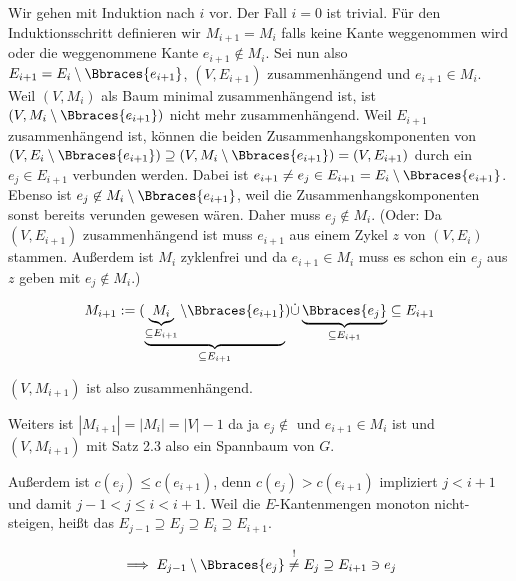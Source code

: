 \begin{solution}
\begin{enumerate}[label = (\Alph*)]
    Wir gehen mit Induktion nach $i$ vor.
    Der Fall $i = 0$ ist trivial.
    Für den Induktionsschritt definieren wir $M_{i+1} = M_i$ falls keine Kante weggenommen wird oder die weggenommene Kante $e_{i+1} \not \in M_i$.
    Sei nun also $E_{i+1} = E_i \setminus \Bbraces{e_{i+1}}$, $(V, E_{i+1})$ zusammenhängend und $e_{i+1} \in M_i$.
    Weil $(V, M_i)$ als Baum minimal zusammenhängend ist, ist $(V, M_i \setminus \Bbraces{e_{i+1}})$ nicht mehr zusammenhängend.
    Weil $E_{i+1}$ zusammenhängend ist, können die beiden Zusammenhangskomponenten von $(V, E_i \setminus \Bbraces{e_{i+1}}) \supseteq (V, M_i \setminus \Bbraces{e_{i+1}}) = (V, E_{i+1})$ durch ein $e_j \in E_{i+1}$ verbunden werden. 
    Dabei ist $e_{i+1} \neq e_j \in E_{i+1} = E_i \setminus \Bbraces{e_{i+1}}$.
    Ebenso ist $e_j \not \in M_i \setminus \Bbraces{e_{i+1}}$, weil die Zusammenhangskomponenten sonst bereits verunden gewesen wären.
    Daher muss $e_j \not \in M_i$. (Oder: Da $(V,E_{i + 1})$ zusammenhängend ist muss $e_{i + 1}$ aus einem Zykel $z$ von $(V,E_i)$ stammen. Außerdem ist $M_i$ zyklenfrei und da $e_{i + 1} \in M_i$ muss es schon ein $e_j$ aus $z$ geben mit $e_j \notin M_i$.)

    \begin{align*}
        M_{i+1}
        :=
        (
            \underbrace
            {
                \underbrace{M_i}_{\subseteq E_{i+1}}
                \setminus
                \Bbraces{e_{i+1}}
            }_{
                \subseteq E_{i+1}
            }
        )
        \dot \cup
        \underbrace
        {
            \Bbraces{e_j}
        }_{
            \subseteq E_{i+1}
        }
        \subseteq
        E_{i+1}
    \end{align*}

    $(V, M_{i+1})$ ist also zusammenhängend.

    Weiters ist $|M_{i+1}| = |M_i| = |V| - 1$ da ja $e_j \not \in$ und $e_{i+1} \in M_i$ ist und $(V, M_{i+1})$ mit Satz 2.3 also ein Spannbaum von $G$.

    Außerdem ist $c(e_j) \leq c(e_{i+1})$, denn $c(e_j) > c(e_{i+1})$ impliziert $j < i + 1$ und damit $j-1 < j \leq i < i+1$.
    Weil die $E$-Kantenmengen monoton nicht-steigen, heißt das $E_{j-1} \supseteq E_j \supseteq E_i \supseteq E_{i+1}$.

    \begin{align*}
        \implies
        E_{j-1} \setminus \Bbraces{e_j}
        \stackrel{!}{\neq}
        E_j
        \supseteq
        E_{i+1}
        \ni
        e_j
    \end{align*}


\end{enumerate}
\end{solution}

